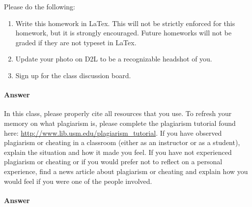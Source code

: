 \documentclass{article}
\begin{document}

Please do the following:
\begin{enumerate}
    \item Write this homework in LaTex. This will not be strictly enforced for
        this homework, but it is strongly encouraged.  Future homeworks will not
        be graded if they are not typeset in LaTex.
    \item Update your photo on D2L to be a recognizable headshot of you.
    \item Sign up for the class discussion board.
\end{enumerate}

\paragraph{Answer}





In this class, please properly cite all resources that you use.  To refresh your
memory on what plagiarism is, please complete the plagiarism tutorial found
here: \url{http://www.lib.usm.edu/plagiarism_tutorial}.  If you have observed
plagiarism or cheating in a classroom (either as an instructor or as a student),
explain the situation and how it made you feel.  If you have not experienced
plagiarism or cheating or if you would prefer not to reflect on a personal
experience, find a news article about plagiarism or cheating and explain how you
would feel if you were one of the people involved.

\paragraph{Answer}


\end{document}
